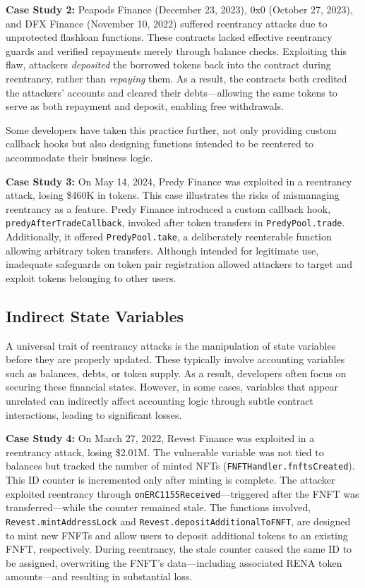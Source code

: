 \textbf{Case Study 2:} \label{case-study:2} Peapods Finance (December 23, 2023), 0x0 (October 27, 2023), and DFX Finance (November 10, 2022) suffered reentrancy attacks due to unprotected flashloan functions. These contracts lacked effective reentrancy guards and verified repayments merely through balance checks. Exploiting this flaw, attackers \emph{deposited} the borrowed tokens back into the contract during reentrancy, rather than \emph{repaying} them. As a result, the contracts both credited the attackers' accounts and cleared their debts—allowing the same tokens to serve as both repayment and deposit, enabling free withdrawals.

Some developers have taken this practice further, not only providing custom callback hooks but also designing functions intended to be reentered to accommodate their business logic.

\textbf{Case Study 3:} \label{case-study:3} On May 14, 2024, Predy Finance was exploited in a reentrancy attack, losing \$460K in tokens. This case illustrates the risks of mismanaging reentrancy as a feature. Predy Finance introduced a custom callback hook, \lstinline{predyAfterTradeCallback}, invoked after token transfers in \lstinline{PredyPool.trade}. Additionally, it offered \lstinline{PredyPool.take}, a deliberately reenterable function allowing arbitrary token transfers. Although intended for legitimate use, inadequate safeguards on token pair registration allowed attackers to target and exploit tokens belonging to other users.





\subsection{Indirect State Variables}

A universal trait of reentrancy attacks is the manipulation of state variables before they are properly updated. These typically involve accounting variables such as balances, debts, or token supply. As a result, developers often focus on securing these financial states. However, in some cases, variables that appear unrelated can indirectly affect accounting logic through subtle contract interactions, leading to significant losses.

\textbf{Case Study 4:} \label{case-study:4} On March 27, 2022, Revest Finance was exploited in a reentrancy attack, losing \$2.01M. The vulnerable variable was not tied to balances but tracked the number of minted NFTs (\lstinline{FNFTHandler.fnftsCreated}). This ID counter is incremented only after minting is complete. The attacker exploited reentrancy through \lstinline{onERC1155Received}—triggered after the FNFT was transferred—while the counter remained stale. The functions involved, \lstinline{Revest.mintAddressLock} and \lstinline{Revest.depositAdditionalToFNFT}, are designed to mint new FNFTs and allow users to deposit additional tokens to an existing FNFT, respectively. During reentrancy, the stale counter caused the same ID to be assigned, overwriting the FNFT's data—including associated RENA token amounts—and resulting in substantial loss.

